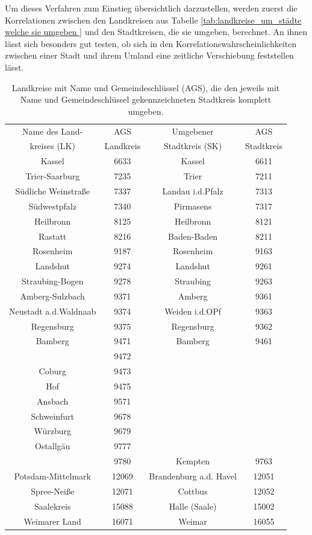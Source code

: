 Um dieses Verfahren zum Einstieg übersichtlich darzustellen, werden zuerst die Korrelationen zwischen den Landkreisen aus Tabelle \ref{tab:landkreise_um_städte welche sie umgeben } und den Stadtkreisen, die sie umgeben, berechnet. An ihnen lässt sich besonders gut testen, ob sich in den Korrelationswahrscheinlichkeiten zwischen einer Stadt und ihrem Umland eine zeitliche Verschiebung feststellen lässt.
\begin{table}[H]
    \centering
    \begin{tabular}{c|c|c|c}
    Name des Land-&AGS &Umgebener  &AGS\\
    kreises (LK)  &Landkreis&Stadtkreis (SK)&Stadtkreis\\
    \hline
Kassel & 6633 & Kassel & 6611 \\\hdashline
Trier-Saarburg & 7235 & Trier & 7211 \\\hdashline
Südliche Weinstraße & 7337 & Landau i.d.Pfalz & 7313 \\\hdashline
Südwestpfalz & 7340 & Pirmasens & 7317 \\\hdashline
Heilbronn & 8125 & Heilbronn & 8121 \\\hdashline
Rastatt & 8216 & Baden-Baden & 8211 \\\hdashline
Rosenheim & 9187 & Rosenheim & 9163 \\\hdashline
Landshut & 9274 & Landshut & 9261 \\\hdashline
Straubing-Bogen & 9278 & Straubing & 9263 \\\hdashline
Amberg-Sulzbach & 9371 & Amberg & 9361 \\\hdashline
Neustadt a.d.Waldnaab & 9374 & Weiden i.d.OPf & 9363 \\\hdashline
Regensburg & 9375 & Regensburg & 9362 \\\hdashline
Bamberg & 9471 & Bamberg & 9461 \\\hdashline

Oberallgäu & 9780 & Kempten & 9763 \\\hdashline
Potsdam-Mittelmark & 12069 & Brandenburg a.d. Havel & 12051 \\\hdashline
Spree-Neiße & 12071 & Cottbus & 12052 \\\hdashline
Saalekreis & 15088 & Halle (Saale) & 15002 \\\hdashline
Weimarer Land & 16071 & Weimar & 16055
    \end{tabular}
    \caption{Landkreise mit Name und Gemeindeschlüssel (AGS), die den jeweils mit Name und Gemeindeschlüssel gekennzeichneten Stadtkreis komplett umgeben.}
    \label{tab:landkreise_um_städte}
\end{table}

